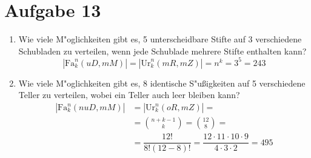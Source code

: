 \section{Aufgabe 13}
\setcounter{section}{13}

\begin{enumerate}[1.]
    \item Wie viele M"oglichkeiten gibt es, 5 unterscheidbare Stifte auf 3 verschiedene
        Schubladen zu verteilen, wenn jede Schublade mehrere Stifte enthalten kann?
        \begin{equation*}
            |\text{Fa}^n_k(uD, mM)| = |\text{Ur}^n_k(mR, mZ)| = n^k = 3^5 = 243
        \end{equation*}

    \item Wie viele M"oglichkeiten gibt es, 8 identische S"u{\ss}igkeiten auf 5
        verschiedene Teller zu verteilen, wobei ein Teller auch leer bleiben
        kann?
        \begin{equation*}
            \begin{aligned}
                |\text{Fa}^n_k(nuD, mM)| &= |\text{Ur}^n_k(oR, mZ)| = \\[10pt]
                                         &= \binom{n + k - 1}{k} = \binom{12}{8} = \\[5pt]
                                         &= \dfrac{12!}{8!(12 - 8)!} = \dfrac{12 \cdot 11 \cdot 10 \cdot 9}{4 \cdot 3 \cdot 2} = 495
            \end{aligned}
        \end{equation*}
\end{enumerate}
